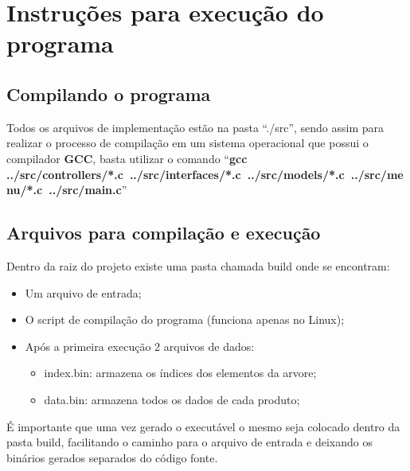 \documentclass[12pt, a4paper]{article}
\begin{document}
\tableofcontents
\listoffigures
\newpage

\section{Instruções para execução do programa}\label{Instruções para execução do programa}

\subsection{Compilando o programa}\label{Compilando o proograma}
Todos os arquivos de implementação estão na pasta ``./src'', sendo assim para realizar o processo de compilação em um sistema operacional que possui o compilador \textbf{GCC}, basta utilizar o comando ``\textbf{gcc ../src/controllers/*.c~../src/interfaces/*.c~../src/models/*.c~../src/menu/*.c~../src/main.c}''

\subsection{Arquivos para compilação e execução}\label{Arquivos para compilação e execução}
Dentro da raiz do projeto existe uma pasta chamada build onde se encontram:
\begin{itemize}
    \item Um arquivo de entrada;
    \item O script de compilação do programa (funciona apenas no Linux);
    \item Após a primeira execução 2 arquivos de dados:
        \begin{itemize}
            \item index.bin: armazena os índices dos elementos da arvore;
            \item data.bin: armazena todos os dados de cada produto;
        \end{itemize}
\end{itemize}

É importante que uma vez gerado o executável o mesmo seja colocado dentro da pasta build, facilitando o caminho para o arquivo de entrada e deixando os binários gerados separados do código fonte.
\end{document}

